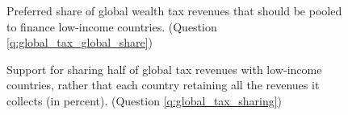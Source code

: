 \begin{figure}[h!]
    \caption[Preferred share of global tax for low-income countries]{Preferred share of global wealth tax revenues that should be pooled to finance low-income countries. (Question \ref{q:global_tax_global_share})}\label{fig:global_tax_global_share}
\end{figure}

\begin{figure}[h!]
    \caption[Support for sharing half of global tax revenues with low-income countries]{Support for sharing half of global tax revenues with low-income countries, rather that each country retaining all the revenues it collects (in percent). (Question \ref{q:global_tax_sharing})}\label{fig:global_tax_sharing}
\end{figure}


